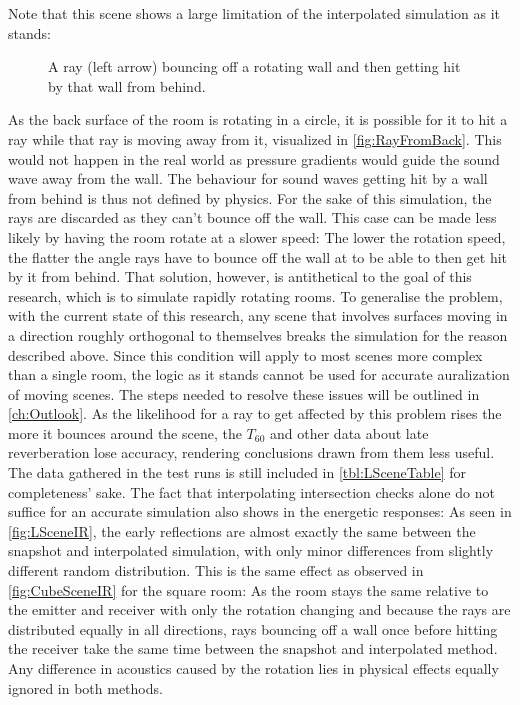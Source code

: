 Note that this scene shows a large limitation of the interpolated simulation as it stands:
\begin{figure}[t!]
    \begin{center}
        
    \end{center}
    \caption{A ray (left arrow) bouncing off a rotating wall and then getting hit by that wall from behind.}\label{fig:RayFromBack}
\end{figure}
As the back surface of the room is rotating in a circle,
it is possible for it to hit a ray while that ray is moving away from it,
visualized in \autoref{fig:RayFromBack}.
This would not happen in the real world as pressure gradients would guide the sound wave away from the wall.
\newline
The behaviour for sound waves getting hit by a wall from behind is thus not defined by physics.
For the sake of this simulation, the rays are discarded as they can't bounce off the wall.
This case can be made less likely by having the room rotate at a slower speed:
The lower the rotation speed, the flatter the angle rays have to bounce off the wall at to be able to then get hit by it from behind.
That solution, however, is antithetical to the goal of this research, which is to simulate rapidly rotating rooms.
\newline
To generalise the problem, with the current state of this research,
any scene that involves surfaces moving in a direction roughly orthogonal to themselves breaks the simulation for the reason described above.
Since this condition will apply to most scenes more complex than a single room,
the logic as it stands cannot be used for accurate auralization of moving scenes.
The steps needed to resolve these issues will be outlined in \autoref{ch:Outlook}.
\newline
As the likelihood for a ray to get affected by this problem rises the more it bounces around the scene,
the \(T_{60}\) and other data about late reverberation lose accuracy,
rendering conclusions drawn from them less useful.
The data gathered in the test runs is still included in \autoref{tbl:LSceneTable} for completeness' sake.
\newline
The fact that interpolating intersection checks alone do not suffice for an accurate simulation also shows in the energetic responses:
As seen in \autoref{fig:LSceneIR}, the early reflections are almost exactly the same between the snapshot and interpolated simulation,
with only minor differences from slightly different random distribution.
This is the same effect as observed in \autoref{fig:CubeSceneIR} for the square room:
As the room stays the same relative to the emitter and receiver with only the rotation changing
and because the rays are distributed equally in all directions,
rays bouncing off a wall once before hitting the receiver take the same time between the snapshot and interpolated method.
Any difference in acoustics caused by the rotation lies in physical effects equally ignored in both methods.

